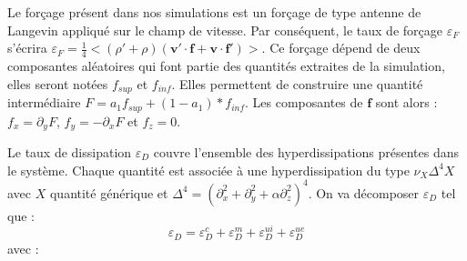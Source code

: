  Le forçage présent dans nos simulations est un forçage de type antenne de Langevin appliqué sur le champ de vitesse. Par conséquent, le taux de forçage $\varepsilon_{F}$ s'écrira $\varepsilon_{F} = \frac{1}{4} < (\rho'+\rho) (\boldsymbol{v'} \cdot  \boldsymbol{f} + \boldsymbol{v} \cdot  \boldsymbol{f'} ) >$. Ce forçage dépend de deux composantes aléatoires qui font partie des quantités extraites de la simulation, elles seront notées $f_{sup}$ et $f_{inf}$. Elles permettent de construire une quantité intermédiaire $F = a_1 f_{sup} + (1-a_1) * f_{inf}$. Les composantes de $\boldsymbol{f}$ sont alors : $f_x = \partial_y F$, $f_y = - \partial_x F$ et $f_z = 0$. 
 
 Le taux de dissipation $\varepsilon_{D}$ couvre l'ensemble des hyperdissipations présentes dans le système. Chaque quantité est associée à une hyperdissipation du type $ \nu_X \Delta^4 X$ avec $X$ quantité générique et $\Delta^4 = (\partial^2_x + \partial^2_y + \alpha \partial^2_z)^4$. On va décomposer $\varepsilon_{D}$ tel que : 
 \begin{equation}
     \varepsilon_{D} = \varepsilon^{c}_{D} + \varepsilon^{m}_{D} + \varepsilon^{ui}_{D} + \varepsilon^{ue}_{D}
 \end{equation}
 avec : 
